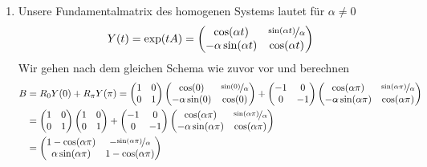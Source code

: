 \begin{solution}
\begin{enumerate}[label = \textbf{\alph*)}]
  \item Unsere Fundamentalmatrix des homogenen Systems lautet für $\alpha \neq 0$
  \begin{align*}
    Y(t) = \exp(tA) = \begin{pmatrix}
      \cos(\alpha t) & \nicefrac{\sin(\alpha t)}{\alpha}  \\ -\alpha\sin(\alpha t) & \cos(\alpha t)
    \end{pmatrix}
  \end{align*}
  Wir gehen nach dem gleichen Schema wie zuvor vor und berechnen
  \begin{align*}
    B &= R_0Y(0) + R_{\pi}Y(\pi) =
    \begin{pmatrix}
      1 & 0 \\ 0 & 1
    \end{pmatrix}
    \begin{pmatrix}
      \cos(0) & \nicefrac{\sin(0)}{\alpha}  \\ -\alpha\sin(0) & \cos(0)
    \end{pmatrix}
    + \begin{pmatrix}
      -1 & 0 \\ 0 & -1
    \end{pmatrix}
    \begin{pmatrix}
      \cos(\alpha \pi) & \nicefrac{\sin(\alpha \pi)}{\alpha}  \\ -\alpha\sin(\alpha \pi) & \cos(\alpha \pi)
    \end{pmatrix} \\
    &= \begin{pmatrix}
      1 & 0 \\ 0 & 1
    \end{pmatrix}
    \begin{pmatrix}
      1 & 0  \\ 0 & 1
    \end{pmatrix}
    + \begin{pmatrix}
      -1 & 0 \\ 0 & -1
    \end{pmatrix}
    \begin{pmatrix}
      \cos(\alpha \pi) & \nicefrac{\sin(\alpha \pi)}{\alpha}  \\ -\alpha\sin(\alpha \pi) & \cos(\alpha \pi)
    \end{pmatrix} \\
    &= \begin{pmatrix}
      1 - \cos(\alpha \pi) & -\nicefrac{\sin(\alpha \pi)}{\alpha} \\
      \alpha\sin(\alpha \pi) & 1 - \cos(\alpha \pi)

\end{pmatrix}
\end{align*}
\end{enumerate}
\end{solution}
